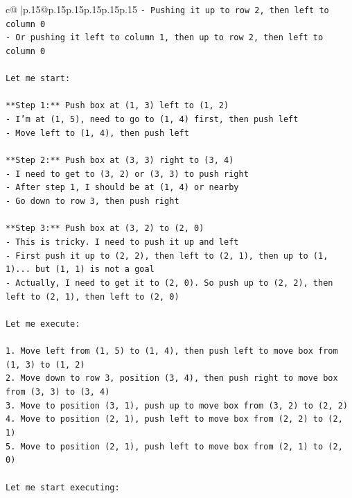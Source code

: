 \documentclass{article}
\begin{document}
{\begin{supertabular}{c@{$\;$}|p{.15\linewidth}@{}p{.15\linewidth}p{.15\linewidth}p{.15\linewidth}p{.15\linewidth}p{.15\linewidth}}
{{{\texttt{{-} Pushing it up to row 2, then left to column 0} \\
\texttt{{-} Or pushing it left to column 1, then up to row 2, then left to column 0} \\
\\ 
\texttt{Let me start:} \\
\\ 
\texttt{**Step 1:** Push box at (1, 3) left to (1, 2)} \\
\texttt{{-} I'm at (1, 5), need to go to (1, 4) first, then push left} \\
\texttt{{-} Move left to (1, 4), then push left} \\
\\ 
\texttt{**Step 2:** Push box at (3, 3) right to (3, 4)} \\
\texttt{{-} I need to get to (3, 2) or (3, 3) to push right} \\
\texttt{{-} After step 1, I should be at (1, 4) or nearby} \\
\texttt{{-} Go down to row 3, then push right} \\
\\ 
\texttt{**Step 3:** Push box at (3, 2) to (2, 0)} \\
\texttt{{-} This is tricky. I need to push it up and left} \\
\texttt{{-} First push it up to (2, 2), then left to (2, 1), then up to (1, 1)... but (1, 1) is not a goal} \\
\texttt{{-} Actually, I need to get it to (2, 0). So push up to (2, 2), then left to (2, 1), then left to (2, 0)} \\
\\ 
\texttt{Let me execute:} \\
\\ 
\texttt{1. Move left from (1, 5) to (1, 4), then push left to move box from (1, 3) to (1, 2)} \\
\texttt{2. Move down to row 3, position (3, 4), then push right to move box from (3, 3) to (3, 4)} \\
\texttt{3. Move to position (3, 1), push up to move box from (3, 2) to (2, 2)} \\
\texttt{4. Move to position (2, 1), push left to move box from (2, 2) to (2, 1)} \\
\texttt{5. Move to position (2, 1), push left to move box from (2, 1) to (2, 0)} \\
\\ 
\texttt{Let me start executing:} \\
\\ 
}}}
\end{supertabular}}
\end{document}
